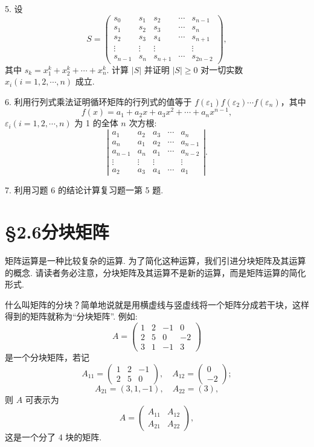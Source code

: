 \documentclass[UTF8, 12pt, fontset=fandol, oneside]{ctexart}
\begin{document}
5. 设
\[
S=\left(\begin{array}{ccccc}
s_0 & s_1 & s_2 & \cdots & s_{n-1}\\
s_1 & s_2 & s_3 & \cdots & s_n\\
s_2 & s_3 & s_4 & \cdots & s_{n+1}\\
\vdots & \vdots & \vdots & & \vdots\\
s_{n-1} & s_n & s_{n+1} & \cdots & s_{2n-2}
\end{array}\right),
\]
其中 $s_k=x_1^k+x_2^k+\cdots+x_n^k$. 计算 $|S|$ 并证明 $|S|\ge 0$ 对一切实数 $x_i(i=1,2,\cdots,n)$ 成立.

6. 利用行列式乘法证明循环矩阵的行列式的值等于 $f(\varepsilon_1)f(\varepsilon_2)\cdots f(\varepsilon_n)$，其中
\[
f(x)=a_1+a_2x+a_3x^2+\cdots+a_nx^{n-1},
\]
$\varepsilon_i(i=1,2,\cdots,n)$ 为 1 的全体 $n$ 次方根:
\[
\left|\begin{array}{ccccc}
a_1 & a_2 & a_3 & \cdots & a_n\\
a_n & a_1 & a_2 & \cdots & a_{n-1}\\
a_{n-1} & a_n & a_1 & \cdots & a_{n-2}\\
\vdots & \vdots & \vdots & & \vdots\\
a_2 & a_3 & a_4 & \cdots & a_1
\end{array}\right|.
\]

7. 利用习题 6 的结论计算复习题一第 5 题.

\section*{§2.6\quad 分块矩阵}

矩阵运算是一种比较复杂的运算. 为了简化这种运算，我们引进分块矩阵及其运算的概念. 请读者务必注意，分块矩阵及其运算不是新的运算，而是矩阵运算的简化形式.

什么叫矩阵的分块？简单地说就是用横虚线与竖虚线将一个矩阵分成若干块，这样得到的矩阵就称为“分块矩阵”. 例如:
\[
A=\left(\begin{array}{ccc|c}
1 & 2 & -1 & 0\\
2 & 5 & 0 & -2\\ \hline
3 & 1 & -1 & 3
\end{array}\right)
\]
是一个分块矩阵，若记
\[
A_{11}=\left(\begin{array}{rrr}
1 & 2 & -1\\
2 & 5 & 0
\end{array}\right),\quad
A_{12}=\left(\begin{array}{r}
0\\
-2
\end{array}\right);
\]
\[
A_{21}=(3,1,-1),\quad A_{22}=(3),
\]
则 $A$ 可表示为
\[
A=\left(\begin{array}{cc}
A_{11} & A_{12}\\
A_{21} & A_{22}
\end{array}\right),
\]
这是一个分了 4 块的矩阵.
\end{document}

